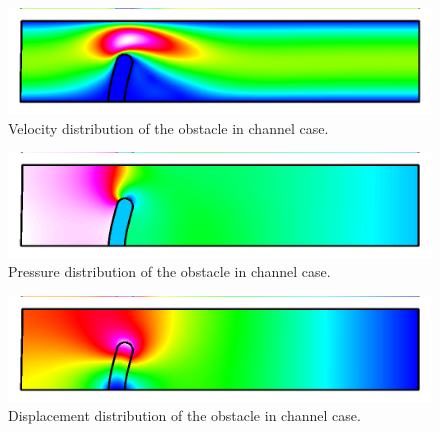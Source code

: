 \begin{figure}[h]
\centering
\includegraphics[width=12cm,viewport=0 5 1024 250,clip]{fsi_obstacle_velo}
\caption{Velocity distribution of the obstacle in channel case.}\label{fg:fsi_obstacle_velo}
\end{figure} 

\begin{figure}[h]
\centering
\includegraphics[width=12cm,viewport=0 5 1024 250,clip]{fsi_obstacle_pres}
\caption{Pressure distribution of the obstacle in channel case.}\label{fg:fsi_obstacle_pres}
\end{figure} 

\begin{figure}[h]
\centering
\includegraphics[width=12cm,viewport=0 5 1024 250,clip]{fsi_obstacle_disp}
\caption{Displacement distribution of the obstacle in channel case.}\label{fg:fsi_obstacle_disp}
\end{figure} 


\hfill
\mbox{}
